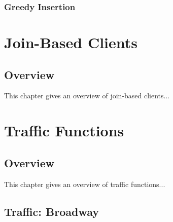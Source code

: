 \section{Greedy Insertion}

\nwenddocs{}\part{Join-Based Clients}
\label{part-join}

\chapter{Overview}
\label{join-overview}

This chapter gives an overview of join-based clients...

\nwenddocs{}\part{Traffic Functions}
\label{part-traffic}

\chapter{Overview}
\label{traffic-overview}

This chapter gives an overview of traffic functions...

\nwenddocs{}\chapter{Traffic: Broadway}

